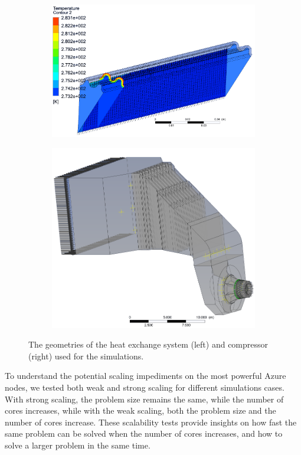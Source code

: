 \documentclass[3p,times]{elsarticle}
\begin{document}
\begin{figure}
\centering
\begin{subfigure}{.4\textwidth}
	\centering
	\includegraphics[width=\linewidth]{pipe_nobg}	
\end{subfigure}
\begin{subfigure}{.5\textwidth}
	\centering
	\includegraphics[width=.7\linewidth]{compressor_nobg}
\end{subfigure}

\caption{The geometries of the heat exchange system (left) and compressor (right) used for the simulations. }
\label{fig:geometries}
\end{figure}

To understand the potential scaling impediments on the most powerful Azure nodes, we tested both weak and strong scaling for different simulations cases. With strong scaling, the problem size remains the same, while the number of cores increases, while with the weak scaling, both the problem size and the number of cores increase. These scalability tests provide insights on how fast the same problem can be solved when the number of cores increases, and how to solve a larger problem in the same time. 
\end{document}
